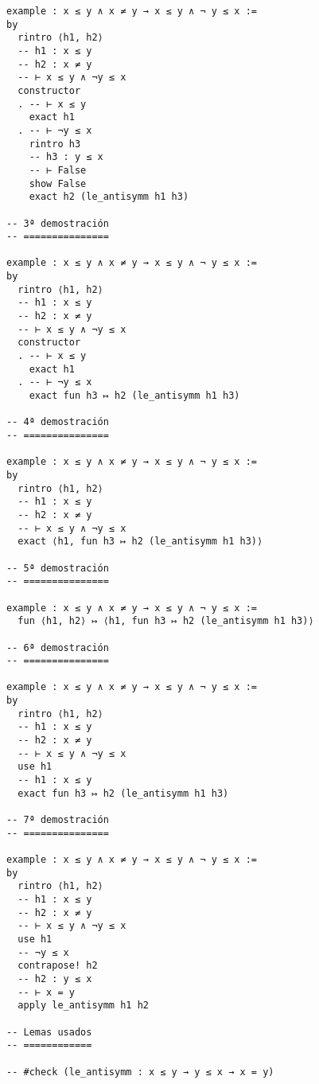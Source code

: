 \begin{verbatim}
example : x ≤ y ∧ x ≠ y → x ≤ y ∧ ¬ y ≤ x :=
by
  rintro ⟨h1, h2⟩
  -- h1 : x ≤ y
  -- h2 : x ≠ y
  -- ⊢ x ≤ y ∧ ¬y ≤ x
  constructor
  . -- ⊢ x ≤ y
    exact h1
  . -- ⊢ ¬y ≤ x
    rintro h3
    -- h3 : y ≤ x
    -- ⊢ False
    show False
    exact h2 (le_antisymm h1 h3)

-- 3ª demostración
-- ===============

example : x ≤ y ∧ x ≠ y → x ≤ y ∧ ¬ y ≤ x :=
by
  rintro ⟨h1, h2⟩
  -- h1 : x ≤ y
  -- h2 : x ≠ y
  -- ⊢ x ≤ y ∧ ¬y ≤ x
  constructor
  . -- ⊢ x ≤ y
    exact h1
  . -- ⊢ ¬y ≤ x
    exact fun h3 ↦ h2 (le_antisymm h1 h3)

-- 4ª demostración
-- ===============

example : x ≤ y ∧ x ≠ y → x ≤ y ∧ ¬ y ≤ x :=
by
  rintro ⟨h1, h2⟩
  -- h1 : x ≤ y
  -- h2 : x ≠ y
  -- ⊢ x ≤ y ∧ ¬y ≤ x
  exact ⟨h1, fun h3 ↦ h2 (le_antisymm h1 h3)⟩

-- 5ª demostración
-- ===============

example : x ≤ y ∧ x ≠ y → x ≤ y ∧ ¬ y ≤ x :=
  fun ⟨h1, h2⟩ ↦ ⟨h1, fun h3 ↦ h2 (le_antisymm h1 h3)⟩

-- 6ª demostración
-- ===============

example : x ≤ y ∧ x ≠ y → x ≤ y ∧ ¬ y ≤ x :=
by
  rintro ⟨h1, h2⟩
  -- h1 : x ≤ y
  -- h2 : x ≠ y
  -- ⊢ x ≤ y ∧ ¬y ≤ x
  use h1
  -- h1 : x ≤ y
  exact fun h3 ↦ h2 (le_antisymm h1 h3)

-- 7ª demostración
-- ===============

example : x ≤ y ∧ x ≠ y → x ≤ y ∧ ¬ y ≤ x :=
by
  rintro ⟨h1, h2⟩
  -- h1 : x ≤ y
  -- h2 : x ≠ y
  -- ⊢ x ≤ y ∧ ¬y ≤ x
  use h1
  -- ¬y ≤ x
  contrapose! h2
  -- h2 : y ≤ x
  -- ⊢ x = y
  apply le_antisymm h1 h2

-- Lemas usados
-- ============

-- #check (le_antisymm : x ≤ y → y ≤ x → x = y)
\end{verbatim}


